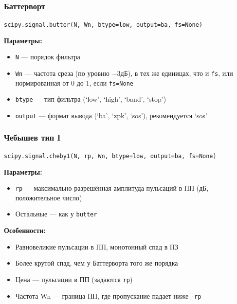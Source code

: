 \documentclass[12pt,a4paper,openany]{book}
\providecommand{\tightlist}{\setlength{\itemsep}{0pt}\setlength{\parskip}{0pt}}
\begin{document}
\subsubsection*{Баттерворт}

\texttt{scipy.\allowbreak{}signal.\allowbreak{}butter(\allowbreak{}N,\allowbreak{}\ Wn,\allowbreak{}\ btype=\allowbreak{}\textquotesingle{}\allowbreak{}low\textquotesingle{}\allowbreak{},\allowbreak{}\ output=\allowbreak{}\textquotesingle{}\allowbreak{}ba\textquotesingle{}\allowbreak{},\allowbreak{}\ fs=\allowbreak{}None)}

\textbf{Параметры:}

\begin{itemize}
\tightlist
\item
  \texttt{N} --- порядок фильтра
\item
  \texttt{Wn} --- частота среза (по уровню \(-3 \text{дБ}\)), в тех же единицах, что и \texttt{fs}, или нормированная от 0 до 1, если \texttt{fs=\allowbreak{}None}
\item
  \texttt{btype} --- тип фильтра (`low', `high', `band', `stop')
\item
  \texttt{output} --- формат вывода (`ba', `zpk', `sos'), рекомендуется `sos'
\end{itemize}

\subsubsection*{Чебышев тип I}

\texttt{scipy.\allowbreak{}signal.\allowbreak{}cheby1(\allowbreak{}N,\allowbreak{}\ rp,\allowbreak{}\ Wn,\allowbreak{}\ btype=\allowbreak{}\textquotesingle{}\allowbreak{}low\textquotesingle{}\allowbreak{},\allowbreak{}\ output=\allowbreak{}\textquotesingle{}\allowbreak{}ba\textquotesingle{}\allowbreak{},\allowbreak{}\ fs=\allowbreak{}None)}

\textbf{Параметры:}

\begin{itemize}
\tightlist
\item
  \texttt{rp} --- максимально разрешённая амплитуда пульсаций в ПП (дБ, положительное число)
\item
  Остальные --- как у \texttt{butter}
\end{itemize}

\textbf{Особенности:}

\begin{itemize}
\tightlist
\item
  Равновеликие пульсации в ПП, монотонный спад в ПЗ
\item
  Более крутой спад, чем у Баттерворта того же порядка
\item
  Цена --- пульсации в ПП (задаются \texttt{rp})
\item
  Частота Wn --- граница ПП, где пропускание падает ниже \texttt{-rp}
\end{itemize}
\end{document}
